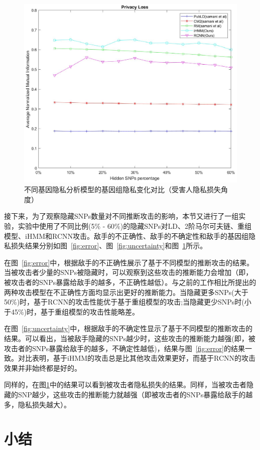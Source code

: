 \begin{figure}[htbp]
	\centering
	\includegraphics[width =0.8\linewidth]{./figures/Fig7-genomic-privacy-quantifying-privacyloss.eps}
	\caption{不同基因隐私分析模型的基因组隐私变化对比（受害人隐私损失角度）}
	\label{fig:privacyloss}
\end{figure}

接下来，为了观察隐藏SNPs数量对不同推断攻击的影响，本节又进行了一组实验，实验中使用了不同比例(5\% - 60\%)的隐藏SNPs对LD、2阶马尔可夫链、重组模型、iHMM和RCNN攻击。敌手的不正确性、敌手的不确定性和敌手的基因组隐私损失结果分别如图~\ref{fig:error}、图~\ref{fig:uncertainty}和图~\ref{fig:privacyloss}所示。

在图~\ref{fig:error}中，根据敌手的不正确性展示了基于不同模型的推断攻击的结果。当被攻击者少量的SNPs被隐藏时，可以观察到这些攻击的推断能力会增加（即，被攻击者的SNPs暴露给敌手的越多，不正确性越低）。与之前的工作相比所提出的两种攻击模型在不正确性方面均显示出更好的推断能力。当隐藏更多SNPs(大于50\%)时，基于RCNN的攻击性能优于基于重组模型的攻击;当隐藏更少SNPs时(小于45\%)时，基于重组模型的攻击性能略差。

在图~\ref{fig:uncertainty}中，根据敌手的不确定性显示了基于不同模型的推断攻击的结果。可以看出，当被敌手隐藏的SNPs越少时，这些攻击的推断能力越强(即，被攻击者的SNPs暴露给敌手的越多，不确定性越低)，结果与图~\ref{fig:error}的结果一致。对比表明，基于iHMM的攻击总是比其他攻击效果更好，而基于RCNN的攻击效果并非始终都是好的。

同样的，在图\ref{fig:privacyloss}中的结果可以看到被攻击者隐私损失的结果。同样，当被攻击者隐藏的SNP越少，这些攻击的推断能力就越强（即被攻击者的SNPs暴露给敌手的越多，隐私损失越大）。

\section{小结}\label{sec:concl}

